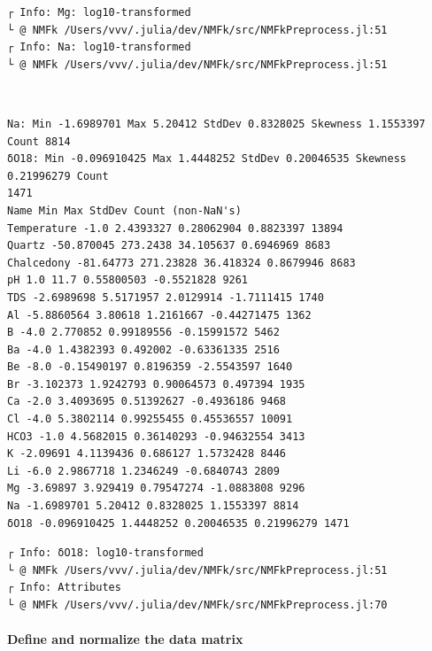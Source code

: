 \documentclass[11pt]{article}
\begin{document}
    \begin{Verbatim}[commandchars=\\\{\}]
┌ Info: Mg: log10-transformed
└ @ NMFk /Users/vvv/.julia/dev/NMFk/src/NMFkPreprocess.jl:51
┌ Info: Na: log10-transformed
└ @ NMFk /Users/vvv/.julia/dev/NMFk/src/NMFkPreprocess.jl:51
    \end{Verbatim}

    \begin{center}
    \end{center}
    { \hspace*{\fill} \\}
    
    \begin{Verbatim}[commandchars=\\\{\}]
Na: Min -1.6989701 Max 5.20412 StdDev 0.8328025 Skewness 1.1553397 Count 8814
δO18: Min -0.096910425 Max 1.4448252 StdDev 0.20046535 Skewness 0.21996279 Count
1471
Name Min Max StdDev Count (non-NaN's)
Temperature -1.0 2.4393327 0.28062904 0.8823397 13894
Quartz -50.870045 273.2438 34.105637 0.6946969 8683
Chalcedony -81.64773 271.23828 36.418324 0.8679946 8683
pH 1.0 11.7 0.55800503 -0.5521828 9261
TDS -2.6989698 5.5171957 2.0129914 -1.7111415 1740
Al -5.8860564 3.80618 1.2161667 -0.44271475 1362
B -4.0 2.770852 0.99189556 -0.15991572 5462
Ba -4.0 1.4382393 0.492002 -0.63361335 2516
Be -8.0 -0.15490197 0.8196359 -2.5543597 1640
Br -3.102373 1.9242793 0.90064573 0.497394 1935
Ca -2.0 3.4093695 0.51392627 -0.4936186 9468
Cl -4.0 5.3802114 0.99255455 0.45536557 10091
HCO3 -1.0 4.5682015 0.36140293 -0.94632554 3413
K -2.09691 4.1139436 0.686127 1.5732428 8446
Li -6.0 2.9867718 1.2346249 -0.6840743 2809
Mg -3.69897 3.929419 0.79547274 -1.0883808 9296
Na -1.6989701 5.20412 0.8328025 1.1553397 8814
δO18 -0.096910425 1.4448252 0.20046535 0.21996279 1471
    \end{Verbatim}

    \begin{Verbatim}[commandchars=\\\{\}]
┌ Info: δO18: log10-transformed
└ @ NMFk /Users/vvv/.julia/dev/NMFk/src/NMFkPreprocess.jl:51
┌ Info: Attributes
└ @ NMFk /Users/vvv/.julia/dev/NMFk/src/NMFkPreprocess.jl:70
    \end{Verbatim}

    \hypertarget{define-and-normalize-the-data-matrix}{%
\paragraph{Define and normalize the data
matrix}\label{define-and-normalize-the-data-matrix}}
\end{document}
